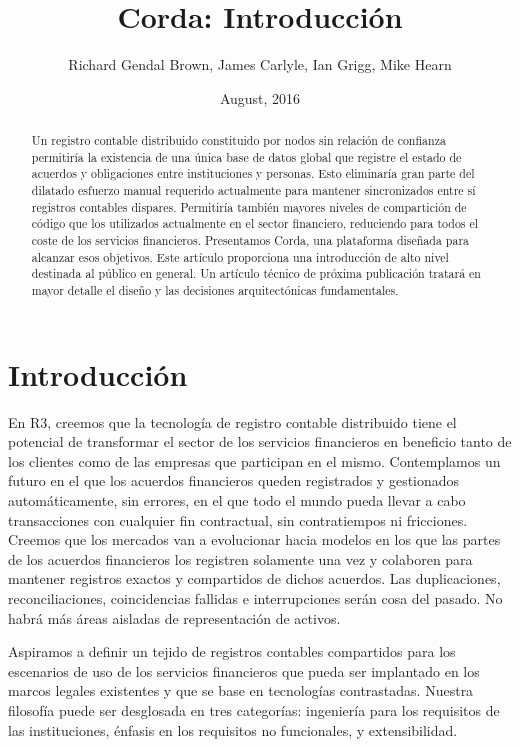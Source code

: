 \documentclass{article}
\author{Richard Gendal Brown, James Carlyle, Ian Grigg, Mike Hearn}
\date{August, 2016}
\title{Corda: Introducción}
\begin{document}
\maketitle 

\begin{abstract}
Un registro contable distribuido constituido por nodos sin relación de confianza permitiría la existencia de una única base de datos global que registre el estado de acuerdos y obligaciones entre instituciones y personas. Esto eliminaría gran parte del dilatado esfuerzo manual requerido actualmente para mantener sincronizados entre sí registros contables dispares. Permitiría también mayores niveles de compartición de código que los utilizados actualmente en el sector financiero, reduciendo para todos el coste de los servicios financieros. Presentamos Corda, una plataforma diseñada para alcanzar esos objetivos. Este artículo proporciona una introducción de alto nivel destinada al público en general. Un artículo técnico de próxima publicación tratará en mayor detalle el diseño y las decisiones arquitectónicas fundamentales.
\end{abstract}
\newpage
\tableofcontents
\newpage
\section{Introducción}
En R3, creemos que la tecnología de registro contable distribuido tiene el potencial de transformar el sector de los servicios financieros en beneficio tanto de los clientes como de las empresas que participan en el mismo. Contemplamos un futuro en el que los acuerdos financieros queden registrados y gestionados automáticamente, sin errores, en el que todo el mundo pueda llevar a cabo transacciones con cualquier fin contractual, sin contratiempos ni fricciones. Creemos que los mercados van a evolucionar hacia modelos en los que las partes de los acuerdos financieros los registren solamente una vez y colaboren para mantener registros exactos y compartidos de dichos acuerdos. Las duplicaciones, reconciliaciones, coincidencias fallidas e interrupciones serán cosa del pasado. No habrá más áreas aisladas de representación de activos.

Aspiramos a definir un tejido de registros contables compartidos para los escenarios de uso de los servicios financieros que pueda ser implantado en los marcos legales existentes y que se base en tecnologías contrastadas. Nuestra filosofía puede ser desglosada en tres categorías: ingeniería para los requisitos de las instituciones, énfasis en los requisitos no funcionales, y extensibilidad.
\end{document}
